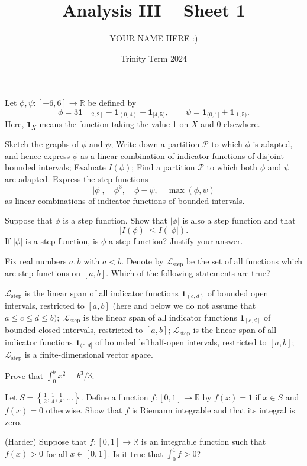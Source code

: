 \documentclass[answers]{exam}
\title{Analysis III -- Sheet 1}
\author{YOUR NAME HERE :)}
\date{Trinity Term 2024}
\begin{document}
\maketitle
\begin{questions}

\question%
Let $\phi, \psi:[-6,6] \rightarrow \mathbb{R}$ be defined by \[
	\phi=3 \mathbf{1}_{[-2,2]}-\mathbf{1}_{(0,4)}+\mathbf{1}_{[4,5)},\qquad \psi=\mathbf{1}_{(0,1]}+\mathbf{1}_{[1,5)} .
\] Here, $\mathbf{1}_{X}$ means the function taking the value 1 on $X$ and 0 elsewhere.
\begin{subparts}
\subpart Sketch the graphs of $\phi$ and $\psi$;
\subpart Write down a partition $\mathcal{P}$ to which $\phi$ is adapted, and hence express $\phi$ as a linear combination of indicator functions of disjoint bounded intervals;
\subpart Evaluate $I(\phi)$;
\subpart Find a partition $\mathcal{P}$ to which both $\phi$ and $\psi$ are adapted. Express the step functions \[
	|\phi|,\quad \phi^{3},\quad \phi-\psi,\quad \max (\phi, \psi)
\] as linear combinations of indicator functions of bounded intervals.
\end{subparts}



\question%
Suppose that $\phi$ is a step function. Show that $|\phi|$ is also a step function and that \[
	|I(\phi)| \leqslant I(|\phi|) .
\] If $|\phi|$ is a step function, is $\phi$ a step function? Justify your answer.



\question%
Fix real numbers $a, b$ with $a<b$. Denote by $\mathscr{L}_{\text {step}}$ be the set of all functions which are step functions on $[a, b]$. Which of the following statements are true?
\begin{subparts}
\subpart $\mathscr{L}_{\text {step}}$ is the linear span of all indicator functions $\mathbf{1}_{(c, d)}$ of bounded open intervals, restricted to $[a, b]$ (here and below we do not assume that $a \leqslant c \leqslant d \leqslant b) ;$
\subpart $\mathscr{L}_{\text {step}}$ is the linear span of all indicator functions $\mathbf{1}_{[c, d]}$ of bounded closed intervals, restricted to $[a, b]$;
\subpart $\mathscr{L}_{\text {step}}$ is the linear span of all indicator functions $\mathbf{1}_{(c, d]}$ of bounded lefthalf-open intervals, restricted to $[a, b]$;
\subpart $\mathscr{L}_{\text {step}}$ is a finite-dimensional vector space.
\end{subparts}



\question%
Prove that $\int_{0}^{b} x^{2}=b^{3} / 3$.



\question%
Let $S=\left\{\frac{1}{2}, \frac{1}{4}, \frac{1}{8}, \ldots\right\}$. Define a function $f:[0,1] \rightarrow \mathbb{R}$ by $f(x)=1$ if $x \in S$ and $f(x)=0$ otherwise. Show that $f$ is Riemann integrable and that its integral is zero.



\question%
(Harder) Suppose that $f:[0,1] \rightarrow \mathbb{R}$ is an integrable function such that $f(x)>0$ for all $x \in[0,1]$. Is it true that $\int_{0}^{1} f>0$?

\end{questions}
\end{document}
